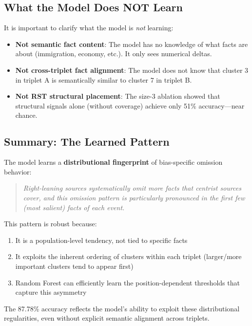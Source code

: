 \documentclass[12pt,a4paper]{article}
\begin{document}
\subsection{What the Model Does NOT Learn}

It is important to clarify what the model is \textit{not} learning:

\begin{itemize}
\item \textbf{Not semantic fact content}: The model has no knowledge of what facts are
      about (immigration, economy, etc.). It only sees numerical deltas.

\item \textbf{Not cross-triplet fact alignment}: The model does not know that cluster 3
      in triplet A is semantically similar to cluster 7 in triplet B.

\item \textbf{Not RST structural placement}: The size-3 ablation showed that structural
      signals alone (without coverage) achieve only 51\% accuracy---near chance.
\end{itemize}

\subsection{Summary: The Learned Pattern}

The model learns a \textbf{distributional fingerprint} of bias-specific omission behavior:

\begin{quote}
\textit{Right-leaning sources systematically omit more facts that centrist sources cover,
and this omission pattern is particularly pronounced in the first few (most salient) facts
of each event.}
\end{quote}

This pattern is robust because:
\begin{enumerate}
\item It is a population-level tendency, not tied to specific facts
\item It exploits the inherent ordering of clusters within each triplet (larger/more important
      clusters tend to appear first)
\item Random Forest can efficiently learn the position-dependent thresholds that capture
      this asymmetry
\end{enumerate}

The 87.78\% accuracy reflects the model's ability to exploit these distributional regularities,
even without explicit semantic alignment across triplets.
\end{document}
